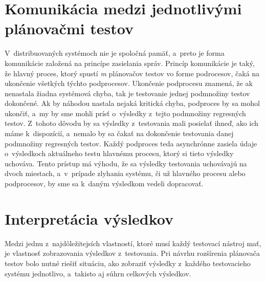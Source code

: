 \section{Komunikácia medzi jednotlivými plánovačmi testov}
\label{sekcia:komunikacia}
V~distribuovaných systémoch nie je spoločná pamäť, a~preto je forma komunikácie založená na princípe zasielania správ.
Princíp komunikácie je taký, že hlavný proces, ktorý spustí \emph{m} plánovačov testov vo forme podrocesov, čaká na ukončenie
všetkých týchto podprocesov. Ukončenie podprocesu znamená, že ak nenastala žiadna systémová chyba, tak je testovanie jednej
podmnožiny testov dokončené. Ak by náhodou nastala nejaká kritická chyba, podproces by sa mohol ukončiť, a~my by sme mohli prísť
o~výsledky z~tejto podmnožiny regresných testov. Z~tohoto dôvodu by sa výsledky z~testovania mali posielať ihneď, ako ich máme k~dispozícií,
a~nemalo by sa čakať na dokončenie testovania danej podmnožiny regresných testov. Každý podproces teda asynchrónne zasiela údaje o~výsledkoch
aktuálneho testu hlavnému procesu, ktorý si tieto výsledky uchováva. Tento prístup má výhodu, že sa výsledky testovania uchovávajú na dvoch miestach,
a~v~prípade zlyhania systému, či už hlavného procesu alebo podprocesov, by sme sa k~daným výsledkom vedeli dopracovať. 


\section{Interpretácia výsledkov}
\label{sekcia:interpretacia_vysledkov}
Medzi jednu z~najdôležitejsích vlastností, ktoré musí každý testovací nástroj mať, je vlastnosť zobrazovania výsledkov z~testovania.
Pri návrhu rozšírenia plánovača testov bolo nutné riešiť situáciu, ako zobraziť výsledky z~každého testovacieho systému jednotlivo,
a~takisto aj súhrn celkových výsledkov. 

